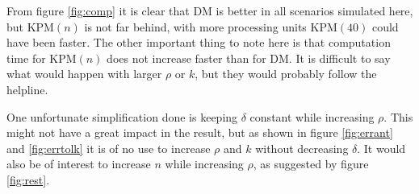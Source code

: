 From figure \ref{fig:comp} it is clear that DM is better in all scenarios simulated here, but KPM$(n)$ is not far behind, with more processing units KPM$(40)$ could have been faster. The other important thing to note here is that computation time for KPM$(n)$ does not increase faster than for DM. It is difficult to say what would happen with larger $\rho$ or $k$, but they would probably follow the helpline.

One unfortunate simplification done is keeping $\delta$ constant while increasing $\rho$. This might not have a great impact in the result, but as shown in figure \ref{fig:errant} and \ref{fig:errtolk} it is of no use to increase $\rho$ and $k$ without decreasing $\delta$. It would also be of interest to increase $n$ while increasing $\rho$, as suggested by figure \ref{fig:rest}.
